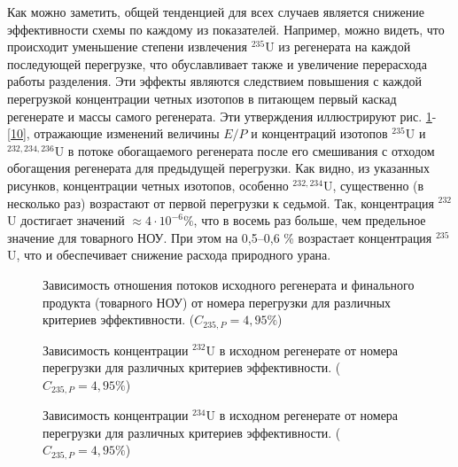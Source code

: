 Как можно заметить, общей тенденцией для всех случаев является снижение эффективности схемы по каждому из показателей.
Например, можно видеть, что происходит уменьшение степени извлечения $^{235}$U из регенерата на каждой последующей перегрузке, что обуславливает также и увеличение перерасхода работы разделения.
Эти эффекты являются следствием повышения с каждой перегрузкой концентрации четных изотопов в питающем первый каскад регенерате и массы самого регенерата.
Эти утверждения иллюстрируют рис. \ref{7}-\ref{10}, отражающие изменений величины $E/P$ и концентраций изотопов $^{235}$U и $^{232,234,236}$U в потоке обогащаемого регенерата после его смешивания с отходом обогащения регенерата для предыдущей перегрузки.
Как видно, из указанных рисунков, концентрации четных изотопов, особенно $^{232,234}$U, существенно (в несколько раз) возрастают от первой перегрузки к седьмой. Так, концентрация $^{232}$U достигает значений $\approx 4\cdot10^{-6} \%$, что в восемь раз больше, чем предельное значение для товарного НОУ. При этом на 0,5--0,6 \% возрастает концентрация $^{235}$U, что и обеспечивает снижение расхода природного урана.      

\begin{figure}[h]
    \centering
    
    \caption{Зависимость отношения потоков исходного регенерата и финального продукта (товарного НОУ) от номера перегрузки для различных критериев эффективности. ($C_{235,{P}}=4,95\%$)}\label{7}
\end{figure}

%     

\begin{figure}[h]
    \centering
    \begin{minipage}{.5\textwidth}
      \centering
      
      \caption{{Зависимость концентрации $^{232}$U в исходном регенерате от номера перегрузки для различных критериев эффективности. ($C_{235,{P}}=4,95\%$){\label{8}}}}
    \end{minipage}%
    \begin{minipage}{.5\textwidth}
      \centering
      
\caption{{Зависимость концентрации $^{234}$U в исходном регенерате от номера перегрузки для различных критериев эффективности. ($C_{235,{P}}=4,95\%$){\label{9}}}}
\end{minipage}
\end{figure}

